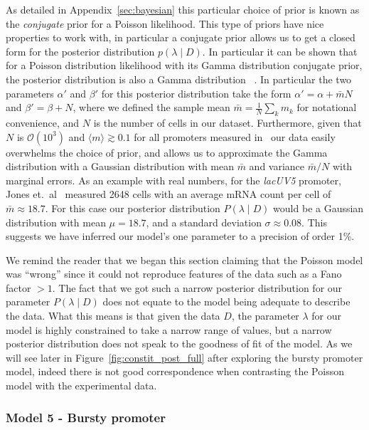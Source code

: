 As detailed in Appendix~\ref{sec:bayesian} this particular choice of prior is known
as the \textit{conjugate} prior for a Poisson likelihood. This type of priors
have nice properties to work with, in particular a conjugate prior allows us to
get a closed form for the posterior distribution $p(\lambda \mid D)$. In
particular it can be shown that for a Poisson distribution likelihood with its
Gamma distribution conjugate prior, the posterior distribution is also a Gamma
distribution ~\cite{Gelman2013}. In particular the two parameters $\alpha'$ and
$\beta'$ for this posterior distribution take the form $\alpha' = \alpha +
\bar{m} N$ and $\beta' = \beta + N$, where we defined the sample mean $\bar{m} =
\frac{1}{N}\sum_k m_k$ for notational convenience, and $N$ is the number of
cells in our dataset. Furthermore, given that $N$ is $\mathcal{O}(10^3)$ and
$\langle m\rangle \gtrsim 0.1$ for all promoters measured in~\cite{Jones2014}
our data easily overwhelms the choice of prior, and allows us to approximate the
Gamma distribution with a Gaussian distribution with mean $\bar{m}$ and variance
$\bar{m} / N$ with marginal errors. As an example with real numbers, for the
\textit{lacUV5} promoter, Jones et.\ al~\cite{Jones2014} measured 2648 cells
with an average mRNA count per cell of $\bar{m} \approx 18.7$. For this case our
posterior distribution $P(\lambda \mid D)$ would be a Gaussian distribution with
mean $\mu = 18.7$, and a standard deviation $\sigma \approx 0.08$. This suggests
we have inferred our model's one parameter to a precision of order 1\%.

We remind the reader that we began this section claiming that the Poisson model
was ``wrong'' since it could not reproduce features of the data such as a Fano
factor $> 1$. The fact that we got such a narrow posterior distribution for our
parameter $P(\lambda \mid D)$ does not equate to the model being adequate to
describe the data. What this means is that given the data $D$, the parameter 
$\lambda$ for our model is highly constrained to take a narrow range of values,
but a narrow posterior distribution does not speak to the goodness of fit of the
model. As we will see later in Figure~\ref{fig:constit_post_full} after
exploring the bursty promoter model, indeed there is not good correspondence
when contrasting the Poisson model with the experimental data.

\subsubsection{Model 5 - Bursty promoter}

